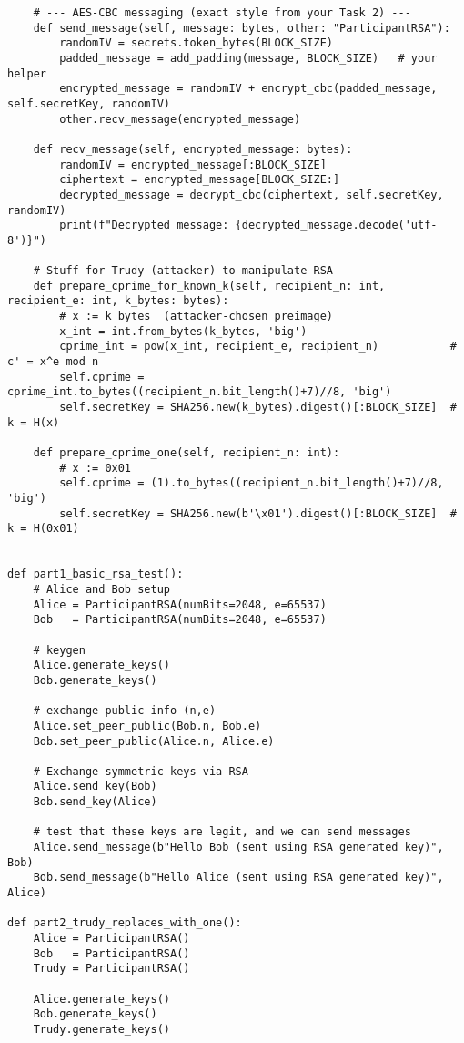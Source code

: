 \documentclass[11pt]{article}
\begin{document}
\begin{lstlisting}
    # --- AES-CBC messaging (exact style from your Task 2) ---
    def send_message(self, message: bytes, other: "ParticipantRSA"):
        randomIV = secrets.token_bytes(BLOCK_SIZE)
        padded_message = add_padding(message, BLOCK_SIZE)   # your helper
        encrypted_message = randomIV + encrypt_cbc(padded_message, self.secretKey, randomIV)
        other.recv_message(encrypted_message)

    def recv_message(self, encrypted_message: bytes):
        randomIV = encrypted_message[:BLOCK_SIZE]
        ciphertext = encrypted_message[BLOCK_SIZE:]
        decrypted_message = decrypt_cbc(ciphertext, self.secretKey, randomIV)
        print(f"Decrypted message: {decrypted_message.decode('utf-8')}")

    # Stuff for Trudy (attacker) to manipulate RSA
    def prepare_cprime_for_known_k(self, recipient_n: int, recipient_e: int, k_bytes: bytes):
        # x := k_bytes  (attacker-chosen preimage)
        x_int = int.from_bytes(k_bytes, 'big')
        cprime_int = pow(x_int, recipient_e, recipient_n)           # c' = x^e mod n
        self.cprime = cprime_int.to_bytes((recipient_n.bit_length()+7)//8, 'big')
        self.secretKey = SHA256.new(k_bytes).digest()[:BLOCK_SIZE]  # k = H(x)

    def prepare_cprime_one(self, recipient_n: int):
        # x := 0x01
        self.cprime = (1).to_bytes((recipient_n.bit_length()+7)//8, 'big')
        self.secretKey = SHA256.new(b'\x01').digest()[:BLOCK_SIZE]  # k = H(0x01)
    

def part1_basic_rsa_test():
    # Alice and Bob setup
    Alice = ParticipantRSA(numBits=2048, e=65537)
    Bob   = ParticipantRSA(numBits=2048, e=65537)

    # keygen
    Alice.generate_keys()
    Bob.generate_keys()

    # exchange public info (n,e)
    Alice.set_peer_public(Bob.n, Bob.e)
    Bob.set_peer_public(Alice.n, Alice.e)

    # Exchange symmetric keys via RSA
    Alice.send_key(Bob)   
    Bob.send_key(Alice)   

    # test that these keys are legit, and we can send messages
    Alice.send_message(b"Hello Bob (sent using RSA generated key)", Bob)
    Bob.send_message(b"Hello Alice (sent using RSA generated key)", Alice)

def part2_trudy_replaces_with_one():
    Alice = ParticipantRSA()
    Bob   = ParticipantRSA()
    Trudy = ParticipantRSA()

    Alice.generate_keys()
    Bob.generate_keys()
    Trudy.generate_keys()


\end{lstlisting}
\end{document}
